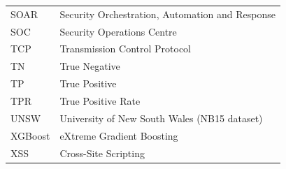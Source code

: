 \begin{longtable}{ll}
    SOAR & Security Orchestration, Automation and Response \\
    SOC & Security Operations Centre \\
    TCP & Transmission Control Protocol \\
    TN & True Negative \\
    TP & True Positive \\
    TPR & True Positive Rate \\
    UNSW & University of New South Wales (NB15 dataset) \\
    XGBoost & eXtreme Gradient Boosting \\
    XSS & Cross-Site Scripting \\
    \bottomrule
\end{longtable}
